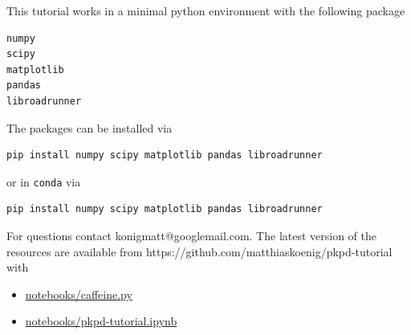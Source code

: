 \documentclass[11pt]{article}
\providecommand{\tightlist}{%
      \setlength{\itemsep}{0pt}\setlength{\parskip}{0pt}}
\begin{document}
This tutorial works in a minimal python environment with the following
package

\begin{verbatim}
numpy
scipy
matplotlib
pandas
libroadrunner
\end{verbatim}

The packages can be installed via

\begin{verbatim}
pip install numpy scipy matplotlib pandas libroadrunner
\end{verbatim}

or in \texttt{conda} via

\begin{verbatim}
pip install numpy scipy matplotlib pandas libroadrunner
\end{verbatim}

For questions contact konigmatt@googlemail.com. The latest version of
the resources are available from
https://github.com/matthiaskoenig/pkpd-tutorial with

\begin{itemize}
\tightlist
\item
  \href{https://github.com/matthiaskoenig/pkpd-tutorial/blob/master/notebooks/caffeine.py}{notebooks/caffeine.py}
\item
  \href{https://github.com/matthiaskoenig/pkpd-tutorial/blob/master/notebooks/pkpd-tutorial.ipynb}{notebooks/pkpd-tutorial.ipynb}
\end{itemize}
\end{document}
